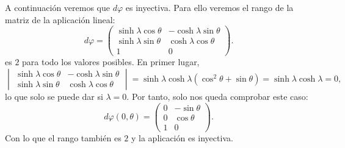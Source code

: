 A continuación veremos que $d \varphi$ es inyectiva. Para ello veremos el rango
de la matriz de la aplicación lineal:
\[
    d \varphi = \begin{pmatrix}
    \sinh \lambda \cos \theta & -\cosh \lambda \sin \theta\\
    \sinh \lambda \sin \theta & \cosh \lambda \cos \theta\\
    1 & 0
    \end{pmatrix}.
\]
es $2$ para todo los valores posibles. En primer lugar,
\[
\begin{vmatrix} 
    \sinh \lambda \cos \theta & -\cosh \lambda \sin \theta\\
    \sinh \lambda \sin \theta & \cosh \lambda \cos \theta
\end{vmatrix} = \sinh \lambda \cosh \lambda \left( \cos^2 \theta + \sin \theta
\right) = \sinh \lambda \cosh \lambda = 0,
\]
lo que solo se puede dar si $\lambda = 0$. Por tanto, solo nos queda comprobar
este caso:
\[
d \varphi \left( 0, \theta \right) = \begin{pmatrix} 
    0 & -\sin \theta\\
    0 & \cos \theta\\
    1 & 0
\end{pmatrix}.
\]
Con lo que el rango también es $2$ y la aplicación es inyectiva.

